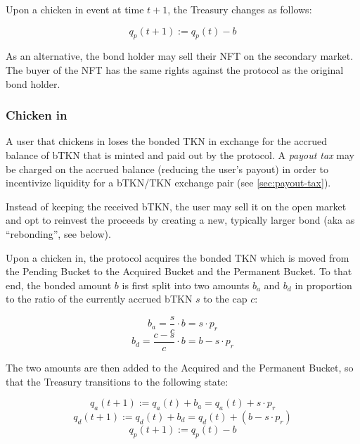 \documentclass{article}
\begin{document}
Upon a chicken in event at time $t+1$, the Treasury changes as follows:

\begin{equation}
  \label{eq:chicken-out-transition}
    q_p(t+1) := q_p(t) - b
\end{equation}

As an alternative, the bond holder may sell their NFT on the secondary market. The buyer of the NFT has the same rights against the protocol as the original bond holder.

\subsubsection{Chicken in}
\label{sec:chicken-in}
A user that chickens in loses the bonded TKN in exchange for the accrued balance of bTKN that is minted and paid out by the protocol. A \textit{payout tax} may be charged on the accrued balance (reducing the user’s payout) in order to incentivize liquidity for a bTKN/TKN exchange pair (see \ref{sec:payout-tax}).

Instead of keeping the received bTKN, the user may sell it on the open market and opt to reinvest the proceeds by creating a new, typically larger bond (aka as “rebonding”, see below).

Upon a chicken in, the protocol acquires the bonded TKN which is moved from the Pending Bucket to the Acquired Bucket and the Permanent Bucket. To that end, the bonded amount $b$ is first split into two amounts $b_a$ and $b_d$ in proportion to the ratio of the currently accrued bTKN $s$ to the cap $c$:

\begin{equation}
  \label{eq:chicken-in-ba}
    b_a = \frac{s}{c} \cdot b = s \cdot p_r
\end{equation}
\begin{equation}
  \label{eq:chicken-in-bd}
    b_d = \frac{c-s}{c} \cdot b = b - s \cdot p_r
\end{equation}

The two amounts are then added to the Acquired and the Permanent Bucket, so that the Treasury transitions to the following state:

\begin{equation}
  \label{eq:chicken-in-qa}
    q_a(t+1) := q_a(t) + b_a = q_a(t) + s \cdot p_r
\end{equation}
\begin{equation}
  \label{eq:chicken-in-qd}
    q_d(t+1) := q_d(t) + b_d = q_d(t) + (b - s \cdot p_r)
\end{equation}
\begin{equation}
  \label{eq:chicken-in-qp}
    q_p(t+1) := q_p(t) - b
\end{equation}
\end{document}
